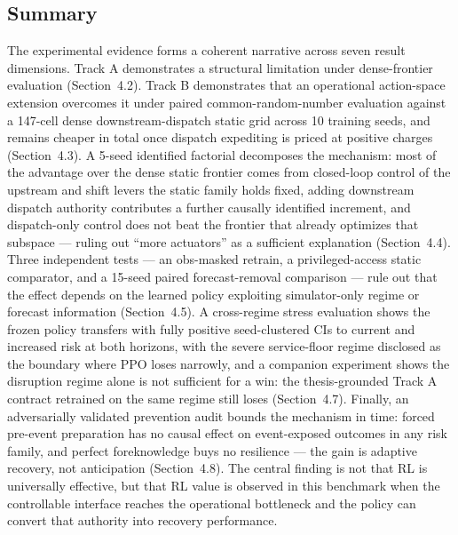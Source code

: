 \hypertarget{49-summary}{%
\subsection{Summary}\label{49-summary}}

The experimental evidence forms a coherent narrative across seven result
dimensions. Track A demonstrates a structural limitation under
dense-frontier evaluation (Section~4.2). Track B demonstrates that an
operational action-space extension overcomes it under paired
common-random-number evaluation against a 147-cell dense
downstream-dispatch static grid across 10 training seeds, and remains
cheaper in total once dispatch expediting is priced at positive charges
(Section~4.3). A 5-seed identified factorial decomposes the mechanism:
most of the advantage over the dense static frontier comes from
closed-loop control of the upstream and shift levers the static family
holds fixed, adding downstream dispatch authority contributes a further
causally identified increment, and dispatch-only control does not beat
the frontier that already optimizes that subspace --- ruling out ``more
actuators'' as a sufficient explanation
(Section~4.4). Three independent tests --- an
obs-masked retrain, a privileged-access static comparator, and a 15-seed
paired forecast-removal comparison --- rule out
that the effect depends on the learned policy exploiting simulator-only
regime or forecast information (Section~4.5). A cross-regime stress
evaluation shows
the frozen policy transfers with fully positive seed-clustered CIs to
current and increased risk at both horizons, with the severe
service-floor regime disclosed as the boundary where PPO loses narrowly,
and a companion experiment
shows the disruption regime alone is not sufficient for a win: the
thesis-grounded Track A contract retrained on the same regime still loses
(Section~4.7). Finally, an adversarially
validated prevention audit bounds the mechanism in time: forced pre-event
preparation has no causal effect on event-exposed outcomes in any risk
family, and perfect foreknowledge buys no resilience --- the gain is
adaptive recovery, not anticipation
(Section~4.8). The central finding is not
that RL is universally effective, but that RL value is observed in this
benchmark when the
controllable interface reaches the operational bottleneck and the policy
can convert that authority into recovery performance.
